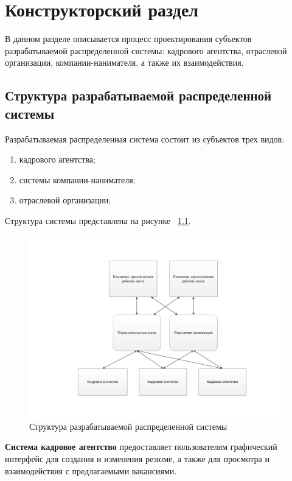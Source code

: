 \chapter{Конструкторский раздел}
\label{cha:design}
В данном разделе описывается процесс проектирования субъектов разрабатываемой распределенной системы: кадрового агентства, отраслевой организации, компании-нанимателя, а также их взаимодействия.

\section{Структура разрабатываемой распределенной системы}
Разрабатываемая распределенная система состоит из субъектов трех видов:
\begin{enumerate}
\item кадрового агентства;
\item системы компании-нанимателя;
\item отраслевой организации;
\end{enumerate}

Структура системы представлена на рисунке ~\ref{fig:structure}. 

\begin{figure}[h!]
  \centering
  \includegraphics[width=\textwidth]{include/UML.pdf}
  \caption{Структура разрабатываемой распределенной системы}
  \label{fig:structure}
\end{figure}

\textbf{Система кадровое агентство} предоставляет пользователям графический интерфейс для создания и изменения резюме, а также для просмотра и взаимодействия с предлагаемыми вакансиями.

